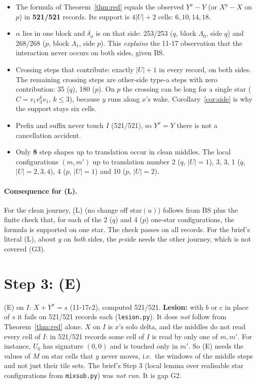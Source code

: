 \documentclass[11pt]{article}
\theoremstyle{definition}\newtheorem{definition}[theorem]{Definition}\newtheorem{remark}[theorem]{Remark}
\begin{document}
\begin{itemize}
\item The formula of Theorem~\ref{thm:red} equals the observed $Y^x-Y$ (or $X^y-X$ on $p$) in \textbf{521/521} records. Its support is $4|U|+2$ cells: $6,10,14,18$.
\item $\alpha$ lies in one block and $\delta_a$ is on that side: 253/253 ($q$, block $\Lambda_0$, side $q$) and 268/268 ($p$, block $\Lambda_1$, side $p$). This \emph{explains} the 11-17 observation
that the interaction never occurs on both sides, given BS.
\item Crossing steps that contribute: exactly $|U|+1$ in every record, on both sides. The remaining crossing steps are other-side type-a steps with zero contribution: 35 ($q$), 180 ($p$).
On $p$ the crossing can be long for a single star ($C=v_1v_3^kv_1$, $k\le3$), because $y$ runs along $x$'s wake. Corollary~\ref{cor:side} is why the support stays six cells.
\item Prefix and suffix never touch $I$ (521/521), so $Y^x=Y$ there is not a cancellation accident.
\item Only \textbf{8} step shapes up to translation occur in clean middles. The local configurations $(m,m')$ up to translation number 2 ($q$, $|U|=1$), 3, 3, 1 ($q$, $|U|=2,3,4$), 4 ($p$, $|U|=1$)
and 10 ($p$, $|U|=2$).
\end{itemize}
\paragraph{Consequence for (L).} For the clean journey, (L) (no change off $\mathrm{star}(u)$) follows from BS plus the finite check that, for each of the 2 ($q$) and 4 ($p$) one-star
configurations, the formula is supported on one star. The check passes on all records. For the brief's literal (L), about $y$ on \emph{both} sides, the $p$-side needs the other
journey, which is not covered (G3).

\section{Step 3: (E)}
(E) on $I$: $X+Y^x=s$ (11-17c2), computed 521/521. \textbf{Lesion:} with $b$ or $c$ in place of $s$ it fails on 521/521 records each (\texttt{lesion.py}).
It does \emph{not} follow from Theorem~\ref{thm:red} alone. $X$ on $I$ is $x$'s solo delta, and the middles do not read every cell of $I$: in 521/521 records some cell of $I$ is read by only
one of $m,m'$. For instance, $U_0$ has signature $(0,0)$ and is touched only in $m'$. So (E) needs the values of $M$ on star cells that $y$ never moves, i.e.\ the windows of the middle steps
and not just their tile sets. The brief's Step 3 (local lemma over realisable star configurations from \texttt{mixsub.py}) was \emph{not run}. It is gap G2.
\end{document}
